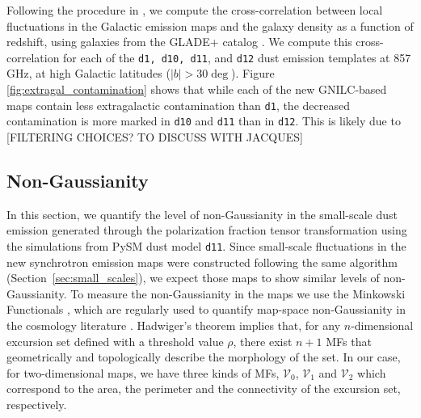 \documentclass[twocolumn]{aastex631}
\newcommand{\deleven}{{\tt d11}}
\begin{document}
Following the procedure in \citet{Chiang:2019}, we compute the cross-correlation between local fluctuations in the Galactic emission maps and the galaxy density as a function of redshift, using galaxies from the GLADE+ catalog \citep{Dalya:2022}. We compute this cross-correlation for each of the \texttt{d1, d10, d11}, and \texttt{d12} dust emission templates at 857 GHz, at high Galactic latitudes ($\left|b\right| > 30\deg$). Figure \ref{fig:extragal_contamination} shows that while each of the new GNILC-based maps contain less extragalactic contamination than \texttt{d1}, the decreased contamination is more marked in \texttt{d10} and \texttt{d11} than in \texttt{d12}. This is likely due to [FILTERING CHOICES? TO DISCUSS WITH JACQUES]


\subsection{Non-Gaussianity} \label{sec:nongaussianity}

In this section, we quantify the level of non-Gaussianity in the small-scale dust emission generated through the polarization fraction tensor transformation using the simulations from PySM dust model \deleven. Since small-scale fluctuations in the new synchrotron emission maps were constructed following the same algorithm (Section~\ref{sec:small_scales}), we expect those maps to show similar levels of non-Gaussianity. To measure the non-Gaussianity in the maps we use the Minkowski Functionals \citep[MFs][]{Minkowski1903}, which are regularly used to quantify map-space non-Gaussianity in the cosmology literature \citep{Martire:2023, Carones:2024}. Hadwiger’s theorem \citep{hadwigerVorlesungenUeberInhalt1957} implies that, for any $n$-dimensional excursion set defined with a threshold value $\rho$, there exist $n+1$ MFs that geometrically and topologically describe the morphology of the set. In our case, for two-dimensional maps, we have three kinds of MFs, $\mathcal{V}_0$, $\mathcal{V}_1$ and $\mathcal{V}_2$ which correspond to the area, the perimeter and the connectivity of the excursion set, respectively.
\end{document}
